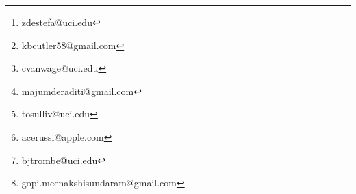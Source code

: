 \author[1]{Zachary DeStefano\thanks{zdestefa@uci.edu}}
\author[1]{Kyle Cutler\thanks{kbcutler58@gmail.com}}
\author[1]{Chris Van Wagenen\thanks{cvanwage@uci.edu}}
\author[1]{Aditi Majumder\thanks{majumderaditi@gmail.com}}
\author[1]{Thomas O'Sullivan\thanks{tosulliv@uci.edu}}
\author[1]{Albert E. Cerussi\thanks{acerussi@apple.com}}
\author[1]{Bruce Tromberg\thanks{bjtrombe@uci.edu}}
\author[1]{M. Gopi\thanks{gopi.meenakshisundaram@gmail.com}}
